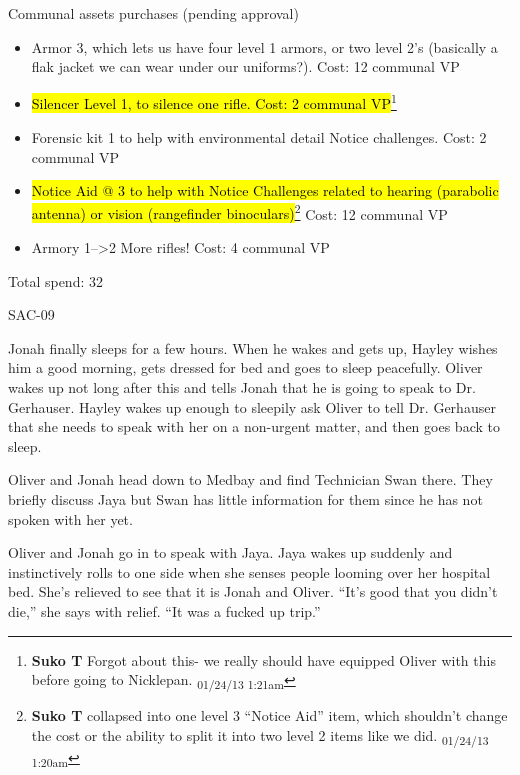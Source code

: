  {\LARGE Communal assets purchases (pending approval) } 

\begin{itemize}
\item Armor 3, which lets us have four level 1 armors, or two level 2's (basically a flak jacket we can wear under our uniforms?).  Cost: 12 communal VP
\item \hl{Silencer Level 1, to silence one rifle. Cost: 2 communal VP}\footnote{\textbf{Suko T }Forgot about this- we really should have equipped Oliver with this before going to Nicklepan. \textsubscript{01/24/13 1:21am}}
\item Forensic kit 1 to help with environmental detail Notice challenges.  Cost: 2 communal VP
\item \hl{Notice Aid @ 3 to help with Notice Challenges related to hearing (parabolic antenna) or vision (rangefinder binoculars)}\footnote{\textbf{Suko T }collapsed into one level 3 ``Notice Aid'' item, which shouldn't change the cost or the ability to split it into two level 2 items like we did. \textsubscript{01/24/13 1:20am}}  Cost: 12 communal VP
\item Armory 1--\textgreater 2  More rifles!  Cost: 4 communal VP
\end{itemize}



Total spend: 32



\noindent\hrulefill





 {\LARGE SAC-09 } 



Jonah finally sleeps for a few hours.  When he wakes and gets up, Hayley wishes him a good morning, gets dressed for bed and goes to sleep peacefully.  Oliver wakes up not long after this and tells Jonah that he is going to speak to Dr. Gerhauser.  Hayley wakes up enough to sleepily ask Oliver to tell Dr. Gerhauser that she needs to speak with her on a non-urgent matter, and then goes back to sleep.



Oliver and Jonah head down to Medbay and find Technician Swan there.  They briefly discuss Jaya but Swan has little information for them since he has not spoken with her yet. 



Oliver and Jonah go in to speak with Jaya.  Jaya wakes up suddenly and instinctively rolls to one side when she senses people looming over her hospital bed.  She's relieved to see that it is Jonah and Oliver. ``It's good that you didn't die,'' she says with relief.  ``It was a fucked up trip.''

